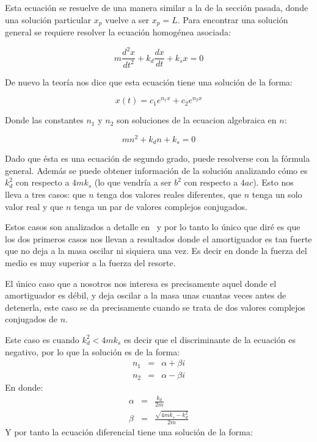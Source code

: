 Esta ecuación se resuelve de una manera similar a la de la sección pasada, donde una solución particular $x_p$ vuelve a ser $x_p = L$.
Para encontrar una solución general se requiere resolver la ecuación homogénea asociada:

\begin{equation}
m \frac{d^2x}{dt^2} + k_d\frac{dx}{dt} + k_s x = 0
\end{equation}

De nuevo la teoría nos dice que esta ecuación tiene una solución de la forma:

\begin{equation}
x(t) = c_1 e^{n_1 x} + c_2 e^{n_2 x} \nonumber
\end{equation}

Donde las constantes $n_1$ y $n_2$ son soluciones de la ecuacion algebraica en $n$:

\begin{equation}
m n^2 +  k_d n + k_s = 0
\end{equation}

Dado que ésta es una ecuación de segundo grado, puede resolverse con la fórmula general.
Además se puede obtener información de la solución analizando cómo es $k_d^2$ con respecto a $4 m k_s$ (lo que vendría a ser $b^2$ con respecto a $4ac$).
Esto nos lleva a tres casos: que $n$ tenga dos valores reales diferentes, que $n$ tenga un solo valor real y que $n$ tenga un par de valores complejos conjugados.

Estos casos son analizados a detalle en~\cite{Ross:Ecuaciones} y por lo tanto lo único que diré es que los dos primeros casos nos llevan a resultados donde el amortiguador es tan fuerte que no deja a la masa oscilar ni siquiera una vez.
Es decir en donde la fuerza del medio es muy superior a la fuerza del resorte.

El único caso que a nosotros nos interesa es precisamente aquel donde el amortiguador es débil, y deja oscilar a la masa unas cuantas veces antes de detenerla, este caso se da precisamente cuando se trata de dos valores complejos conjugados de $n$. 

Este caso es cuando $k_d^2 < 4 m k_s$ es decir que el discriminante de la ecuación es negativo, por lo que la solución es de la forma:
\begin{eqnarray}
n_1 & = & \alpha + \beta i \nonumber \\
n_2 & = & \alpha - \beta i \nonumber
\end{eqnarray}
En donde:
\begin{eqnarray}
\alpha & = & \frac{k_d}{2m} \nonumber \\
\beta  & = & \frac{\sqrt{4 m k_s - k_d^2}}{2m} \nonumber
\end{eqnarray}
Y por tanto la ecuación diferencial tiene una solución de la forma:

